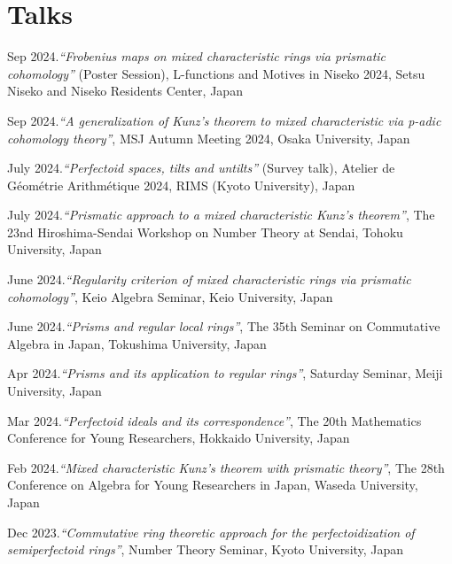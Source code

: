 \documentclass[10pt,a4paper,sans]{moderncv}
\begin{document}
\section{Talks}

\begin{etaremune}[start=\totvalue{talks}]
  \item {} Sep 2024.\emph{``Frobenius maps on mixed characteristic rings via prismatic cohomology''} (Poster Session), \textsf{L-functions and Motives in Niseko 2024}, Setsu Niseko and Niseko Residents Center, Japan
  \item {} Sep 2024.\emph{``A generalization of Kunz's theorem to mixed characteristic via p-adic cohomology theory''}, \textsf{MSJ Autumn Meeting 2024}, Osaka University, Japan
  \item {} July 2024.\emph{``Perfectoid spaces, tilts and untilts''} (Survey talk), \textsf{Atelier de Géométrie Arithmétique 2024}, RIMS (Kyoto University), Japan
  \item {} July 2024.\emph{``Prismatic approach to a mixed characteristic Kunz's theorem''}, \textsf{The 23nd Hiroshima-Sendai Workshop on Number Theory at Sendai}, Tohoku University, Japan
  \item {} June 2024.\emph{``Regularity criterion of mixed characteristic rings via prismatic cohomology''}, \textsf{Keio Algebra Seminar}, Keio University, Japan
  \item {} June 2024.\emph{``Prisms and regular local rings''}, \textsf{The 35th Seminar on Commutative Algebra in Japan}, Tokushima University, Japan
  \item {} Apr 2024.\emph{``Prisms and its application to regular rings''}, \textsf{Saturday Seminar}, Meiji University, Japan
  \item {} Mar 2024.\emph{``Perfectoid ideals and its correspondence''}, \textsf{The 20th Mathematics Conference for Young Researchers}, Hokkaido University, Japan
  \item {} Feb 2024.\emph{``Mixed characteristic Kunz's theorem with prismatic theory''}, \textsf{The 28th Conference on Algebra for Young Researchers in Japan}, Waseda University, Japan
  \item {} Dec 2023.\emph{``Commutative ring theoretic approach for the perfectoidization of semiperfectoid rings''}, \textsf{Number Theory Seminar}, Kyoto University, Japan

\end{etaremune}
\end{document}

